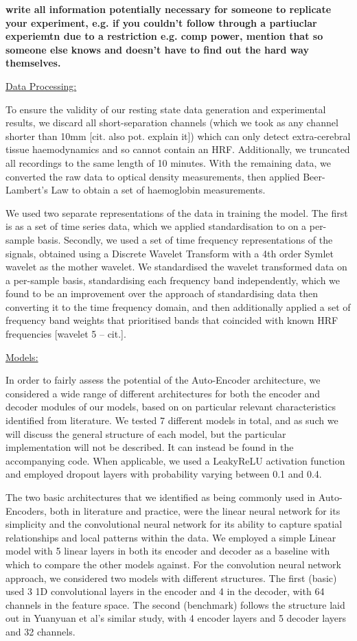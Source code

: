 \documentclass[9pt]{article}
\begin{document}
\textbf{write all information potentially necessary for someone to replicate your experiment, e.g. if you couldn't follow through a partiuclar experiemtn due to a restriction e.g. comp power, mention that so someone else knows and doesn't have to find out the hard way themselves.}

\ul{Data Processing:}

To ensure the validity of our resting state data generation and experimental results, we discard all short-separation channels (which we took as any channel shorter than 10mm [cit. also pot. explain it]) which can only detect extra-cerebral tissue haemodynamics and so cannot contain  an HRF. Additionally, we truncated all recordings to the same length of 10 minutes. With the remaining data, we converted the raw data to optical density measurements, then applied Beer-Lambert's Law to obtain a set of haemoglobin measurements.

We used two separate representations of the data in training the model. The first is as a set of time series data, which we applied standardisation to on a per-sample basis. Secondly, we used a set of time frequency representations of the signals, obtained using a Discrete Wavelet Transform with a 4th order Symlet wavelet as the mother wavelet. We standardised the wavelet transformed data on a per-sample basis, standardising each frequency band independently, which we found to be an improvement over the approach of standardising data then converting it to the time frequency domain, and then additionally applied a set of frequency band weights that prioritised bands that coincided with known HRF frequencies [wavelet 5 -- cit.].

\ul{Models:}

In order to fairly assess the potential of the Auto-Encoder architecture, we considered a wide range of different architectures for both the encoder and decoder modules of our models, based on on particular relevant characteristics identified from literature. We tested 7 different models in total, and as such we will discuss the general structure of each model, but the particular implementation will not be described. It can instead be found in the accompanying code. When applicable, we used a LeakyReLU activation function and employed dropout layers with probability varying between 0.1 and 0.4.

The two basic architectures that we identified as being commonly used in Auto-Encoders, both in literature and practice, were the linear neural network for its simplicity and the convolutional neural network for its ability to capture spatial relationships and local patterns within the data. We employed a simple Linear model with 5 linear layers in both its encoder and decoder as a baseline with which to compare the other models against. For the convolution neural network approach, we considered two models with different structures. The first (basic) used 3 1D convolutional layers in the encoder and 4 in the decoder, with 64 channels in the feature space. The second (benchmark) follows the structure laid out in Yuanyuan et al's similar study, with 4 encoder layers and 5 decoder layers and 32 channels.
\end{document}
